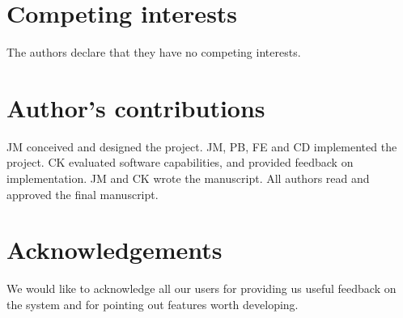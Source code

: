 \documentclass{bmcart}
\begin{document}
\begin{backmatter}

\section*{Competing interests}
The authors declare that they have no competing interests.

\section*{Author's contributions}
JM conceived and designed the project. JM, PB, FE and CD implemented the project.
CK evaluated software capabilities, and provided feedback on implementation. JM
and CK wrote the manuscript. All authors read and approved the final manuscript.

\section*{Acknowledgements}
We would like to acknowledge all our users for providing us useful feedback on
the system and for pointing out features worth developing.






\end{backmatter}
\end{document}
